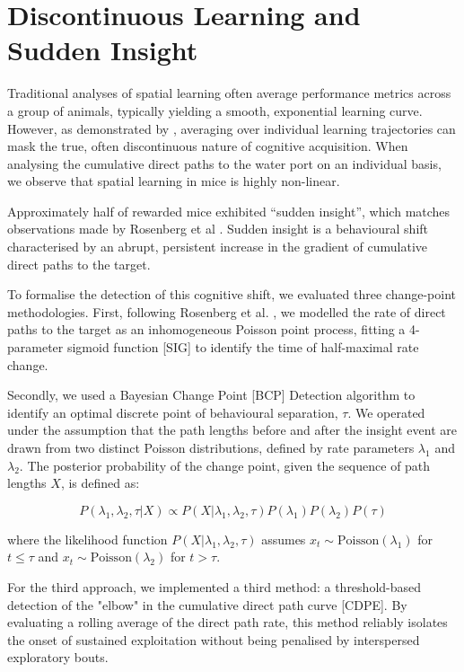 \section{Discontinuous Learning and Sudden Insight}
\label{sec:sudden_insight}

Traditional analyses of spatial learning often average performance metrics across a group of animals, typically yielding a smooth, exponential learning curve. However, as demonstrated by \cite{gallistel2004learning}, averaging over individual learning trajectories can mask the true, often discontinuous nature of cognitive acquisition. When analysing the cumulative direct paths to the water port on an individual basis, we observe that spatial learning in mice is highly non-linear.

Approximately half of rewarded mice exhibited ``sudden insight'', which matches observations made by Rosenberg et al \cite{rosenberg2021mice}. Sudden insight is a behavioural shift characterised by an abrupt, persistent increase in the gradient of cumulative direct paths to the target.

To formalise the detection of this cognitive shift, we evaluated three change-point methodologies. First, following Rosenberg et al. \cite{rosenberg2021mice}, we modelled the rate of direct paths to the target as an inhomogeneous Poisson point process, fitting a 4-parameter sigmoid function [SIG] to identify the time of half-maximal rate change.

Secondly, we used a Bayesian Change Point [BCP] Detection algorithm to identify an optimal discrete point of behavioural separation, $\tau$. We operated under the assumption that the path lengths before and after the insight event are drawn from two distinct Poisson distributions, defined by rate parameters $\lambda_1$ and $\lambda_2$. The posterior probability of the change point, given the sequence of path lengths $X$, is defined as:

\begin{equation}
    P(\lambda_1, \lambda_2, \tau | X) \propto P(X | \lambda_1, \lambda_2, \tau) P(\lambda_1) P(\lambda_2) P(\tau)
\end{equation}

where the likelihood function $P(X | \lambda_1, \lambda_2, \tau)$ assumes $x_t \sim \text{Poisson}(\lambda_1)$ for $t \leq \tau$ and $x_t \sim \text{Poisson}(\lambda_2)$ for $t > \tau$. 

For the third approach, we implemented a third method: a threshold-based detection of the "elbow" in the cumulative direct path curve [CDPE]. By evaluating a rolling average of the direct path rate, this method reliably isolates the onset of sustained exploitation without being penalised by interspersed exploratory bouts.

